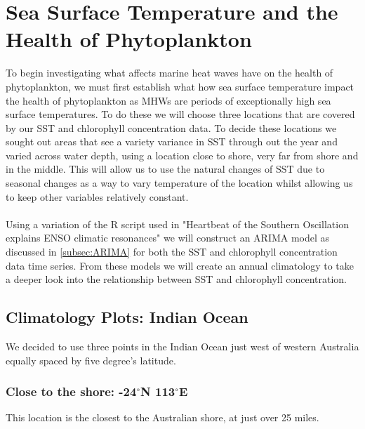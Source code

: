 \section{Sea Surface Temperature and the Health of Phytoplankton}

To begin investigating what affects marine heat waves have on the health of phytoplankton, we must first establish what how sea surface temperature impact the health of phytoplankton as MHWs are periods of exceptionally high sea surface temperatures. To do these we will choose three locations that are covered by our SST and chlorophyll concentration data. To decide these locations we sought out areas that see a variety variance in SST through out the year and varied across water depth, using a location close to shore, very far from shore and in the middle. This will allow us to use the natural changes of SST due to seasonal changes as a way to vary temperature of the location whilst allowing us to keep other variables relatively constant.
\\\\
Using a variation of the R script used in "Heartbeat of the Southern Oscillation explains ENSO climatic resonances" \cite{bruun2017heartbeat} we will construct an ARIMA model as discussed in \autoref{subsec:ARIMA} for both the SST and chlorophyll concentration data time series. From these models we will create an annual climatology to take a deeper look into the relationship between SST and chlorophyll concentration.

\subsection{Climatology Plots: Indian Ocean}

We decided to use three points in the Indian Ocean just west of western Australia equally spaced by five degree's latitude.

\subsubsection{Close to the shore: -24$^{\circ}$N 113$^{\circ}$E}

This location is the closest to the Australian shore, at just over 25 miles. 

